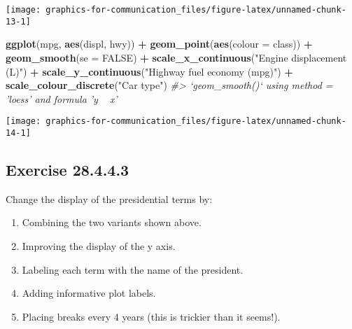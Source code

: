 \documentclass[]{book}
\newenvironment{Shaded}{\begin{snugshade}}{\end{snugshade}}
\newcommand{\CommentTok}[1]{\textcolor[rgb]{0.56,0.35,0.01}{\textit{#1}}}
\newcommand{\DataTypeTok}[1]{\textcolor[rgb]{0.13,0.29,0.53}{#1}}
\newcommand{\KeywordTok}[1]{\textcolor[rgb]{0.13,0.29,0.53}{\textbf{#1}}}
\newcommand{\NormalTok}[1]{#1}
\newcommand{\OperatorTok}[1]{\textcolor[rgb]{0.81,0.36,0.00}{\textbf{#1}}}
\newcommand{\OtherTok}[1]{\textcolor[rgb]{0.56,0.35,0.01}{#1}}
\newcommand{\StringTok}[1]{\textcolor[rgb]{0.31,0.60,0.02}{#1}}
\providecommand{\tightlist}{%
  \setlength{\itemsep}{0pt}\setlength{\parskip}{0pt}}
\theoremstyle{plain}
\theoremstyle{remark}
\begin{document}
\begin{center}\texttt{[image: graphics-for-communication\_files/figure-latex/unnamed-chunk-13-1]} \end{center}

\begin{Shaded}
\begin{Highlighting}[]
\KeywordTok{ggplot}\NormalTok{(mpg, }\KeywordTok{aes}\NormalTok{(displ, hwy)) }\OperatorTok{+}
\StringTok{  }\KeywordTok{geom_point}\NormalTok{(}\KeywordTok{aes}\NormalTok{(}\DataTypeTok{colour =}\NormalTok{ class)) }\OperatorTok{+}
\StringTok{  }\KeywordTok{geom_smooth}\NormalTok{(}\DataTypeTok{se =} \OtherTok{FALSE}\NormalTok{) }\OperatorTok{+}
\StringTok{  }\KeywordTok{scale_x_continuous}\NormalTok{(}\StringTok{"Engine displacement (L)"}\NormalTok{) }\OperatorTok{+}
\StringTok{  }\KeywordTok{scale_y_continuous}\NormalTok{(}\StringTok{"Highway fuel economy (mpg)"}\NormalTok{) }\OperatorTok{+}
\StringTok{  }\KeywordTok{scale_colour_discrete}\NormalTok{(}\StringTok{"Car type"}\NormalTok{)}
\CommentTok{#> `geom_smooth()` using method = 'loess' and formula 'y ~ x'}
\end{Highlighting}
\end{Shaded}

\begin{center}\texttt{[image: graphics-for-communication\_files/figure-latex/unnamed-chunk-14-1]} \end{center}

\hypertarget{exercise-28.4.4.3}{%
\subsection*{\texorpdfstring{Exercise
{28.4.4.3}}{Exercise 28.4.4.3}}\label{exercise-28.4.4.3}}

Change the display of the presidential terms by:

\begin{enumerate}
\def\labelenumi{\arabic{enumi}.}
\tightlist
\item
  Combining the two variants shown above.
\item
  Improving the display of the y axis.
\item
  Labeling each term with the name of the president.
\item
  Adding informative plot labels.
\item
  Placing breaks every 4 years (this is trickier than it seems!).
\end{enumerate}
\end{document}
